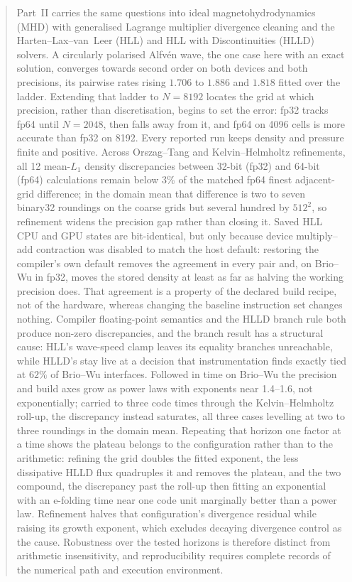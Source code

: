 \begin{abstract}
Part~II carries the same questions into ideal magnetohydrodynamics (MHD) with
generalised Lagrange multiplier divergence cleaning and the
Harten--Lax--van~Leer (HLL) and HLL with Discontinuities (HLLD) solvers. A
circularly polarised Alfv\'en wave, the one case here with an exact solution,
converges towards second order on both devices and both precisions, its
pairwise rates rising \(1.706\) to \(1.886\) and \(1.818\) fitted over the
ladder.
Extending that ladder to \(N=8192\) locates the grid at which precision, rather
than discretisation, begins to set the error: fp32 tracks fp64 until
\(N=2048\), then falls away from it, and fp64 on 4096 cells is more accurate
than fp32 on 8192. Every reported run keeps density and pressure finite and
positive. Across
Orszag--Tang and Kelvin--Helmholtz refinements, all 12 mean-\(L_1\) density
discrepancies between 32-bit (fp32) and 64-bit (fp64) calculations remain below
3\% of the matched fp64 finest adjacent-grid difference; in the domain mean
that difference is two to seven binary32 roundings on the coarse grids but
several hundred by \(512^2\), so refinement widens the precision gap rather
than closing it. Saved HLL CPU and GPU states are bit-identical, but only
because device multiply--add contraction was disabled to match the host
default: restoring the compiler's own default removes the agreement in every
pair and, on Brio--Wu in fp32, moves the stored density at least as far as
halving the working precision does. That agreement is a property of the declared build
recipe, not of the hardware, whereas changing the baseline instruction set
changes nothing. Compiler floating-point semantics and the HLLD branch rule
both produce non-zero discrepancies, and the branch result has a structural
cause: HLL's wave-speed clamp leaves its equality branches unreachable, while
HLLD's stay live at a decision that instrumentation finds exactly tied at
\(62\%\) of Brio--Wu interfaces. Followed in time on Brio--Wu the precision and
build axes grow as power laws with exponents near 1.4--1.6, not exponentially;
carried to three code times through the Kelvin--Helmholtz roll-up, the
discrepancy instead saturates, all three cases levelling at two to three
roundings in the domain mean. Repeating that horizon one factor at a time shows
the plateau belongs to the configuration rather than to the arithmetic:
refining the grid doubles the fitted exponent, the less dissipative HLLD flux
quadruples it and removes the plateau, and the two compound, the discrepancy
past the roll-up then fitting an exponential with an e-folding time near one
code unit marginally better than a power law. Refinement halves that configuration's divergence residual while raising
its growth exponent, which excludes decaying divergence control as the cause.
Robustness over the tested horizons is therefore distinct from arithmetic
insensitivity, and reproducibility requires complete records of the numerical
path and execution environment.
\end{abstract}

